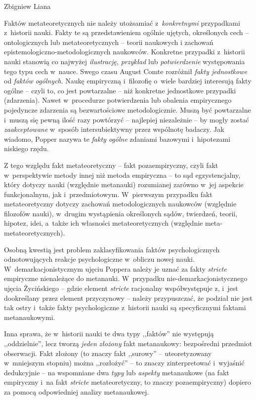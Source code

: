 \begin{artplenv}{Zbigniew Liana}
\begin{uwaga}
Faktów metateoretycznych nie należy utożsamiać z~\textit{konkretnymi} przypadkami z~historii nauki.
Fakty te są przedstawieniem ogólnie ujętych, określonych cech -- ontologicznych lub metateoretycznych -- teorii naukowych
i zachowań epistemologiczno-metodologicznych naukowców. Konkretne przypadki z~historii nauki stanowią co najwyżej
\textit{ilustrację}, \textit{przykład} lub \textit{potwierdzenie} występowania tego typu cech w~nauce. Swego czasu August
Comte rozróżnił \textit{fakty jednostkowe} od \textit{faktów ogólnych}. Naukę empiryczną i~filozofię o~wiele bardziej
interesują fakty ogólne -- czyli to, co jest powtarzalne -- niż konkretne jednostkowe przypadki (zdarzenia). Nawet
w~procedurze potwierdzenia lub obalenia empirycznego pojedyncze zdarzenia są bezwartościowe metodologicznie. Muszą być
powtarzalne i~muszą się pewną ilość razy powtórzyć -- najlepiej niezależnie -- by mogły zostać \textit{zaakceptowane} w~sposób
intersubiektywny przez wspólnotę badaczy. Jak wiadomo, Popper nazywa te \textit{fakty ogólne} zdaniami bazowymi i~hipotezami
niskiego rzędu.

Z tego względu fakt metateoretyczny -- fakt pozaempiryczny, czyli fakt w~perspektywie metody innej niż metoda empiryczna
-- to sąd egzystencjalny, który dotyczy nauki (względnie metanauki) rozumianej zarówno w~jej aspekcie funkcjonalnym,
jak i~przedmiotowym. W~pierwszym przypadku fakt metateoretyczny dotyczy zachowań metodologicznych naukowców (względnie
filozofów nauki), w~drugim wystąpienia określonych sądów, twierdzeń, teorii, hipotez, idei, a~także ich własności
metateoretycznych (względnie meta-metateoretycznych).
\end{uwaga}

\begin{uwaga}
Osobną kwestią jest problem zaklasyfikowania faktów psychologicznych odnotowujących reakcje
psychologiczne w~obliczu nowej nauki. W~demarkacjonistycznym ujęciu Poppera należy je uznać za fakty \textit{stricte}
empiryczne nienależące do metanauki. W~przypadku nie-demarkacjonistycznego ujęcia Życińskiego -- gdzie element
\textit{stricte} racjonalny współwystępuje z, i~jest dookreślany przez element przyczynowy -- należy przypuszczać, że
podział nie jest tak ostry i~także fakty psychologiczne z~historii nauki są specyficznymi faktami metanaukowymi.

Inna sprawa, że w~historii nauki te dwa typy ,,faktów'' nie występują ,,oddzielnie'', lecz tworzą \textit{jeden}
\textit{złożony} fakt metanaukowy: bezpośredni przedmiot obserwacji. Fakt złożony (to znaczy fakt ,,surowy'' --
uteoretyzowany w~mniejszym stopniu) można ,,rozłożyć'' -- to znaczy zinterpretować i~wyjaśnić dedukcyjnie -- na wspomniane
dwa \textit{typy} lub\textit{ aspekty} metanaukowe (na fakt empiryczny i~na fakt \textit{stricte} metateoretyczny, to znaczy
pozaempiryczny) dopiero za pomocą odpowiedniej analizy metanaukowej.


\end{uwaga}
\end{artplenv}
